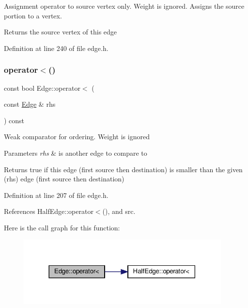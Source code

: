 Assignment operator to source vertex only. Weight is ignored. Assigns the source portion to a vertex. \begin{DoxyReturn}{Returns}
the source vertex of this edge 
\end{DoxyReturn}


Definition at line 240 of file edge.\+h.

\mbox{\label{classEdge_a97799770a75ae0d09208203bdeb6cfee}} 
\subsubsection{\texorpdfstring{operator$<$()}{operator<()}}
{\footnotesize\ttfamily const bool Edge\+::operator$<$ (\begin{DoxyParamCaption}\item[{const \hyperlink{classEdge}{Edge} \&}]{rhs }\end{DoxyParamCaption}) const\hspace{0.3cm}{\ttfamily [inline]}}

Weak comparator for ordering. Weight is ignored 
\begin{DoxyParams}{Parameters}
{\em rhs} & is another edge to compare to \\
\hline
\end{DoxyParams}
\begin{DoxyReturn}{Returns}
true if this edge (first source then destination) is smaller than the given (rhs) edge (first source then destination) 
\end{DoxyReturn}


Definition at line 207 of file edge.\+h.



References Half\+Edge\+::operator$<$(), and src.

Here is the call graph for this function\+:
\nopagebreak
\begin{figure}[H]
\begin{center}
\leavevmode
\includegraphics[width=306pt]{classEdge_a97799770a75ae0d09208203bdeb6cfee_cgraph}
\end{center}
\end{figure}
\mbox{\label{classEdge_abe84b58ced477ebeef5078e4cb48b49f}} 
